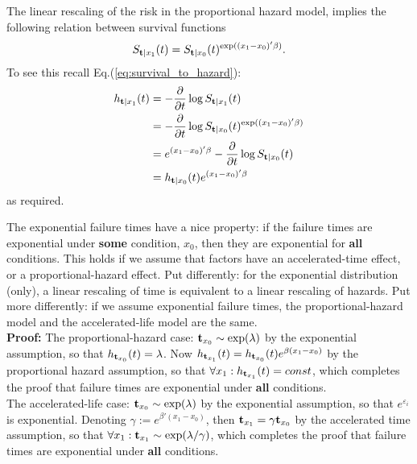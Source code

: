 The linear rescaling of the risk in the proportional hazard model, implies the following relation between survival functions
\begin{align}
\label{eq:survival_proportional_hazard}
	S_{\mathbf{t}|x_1} (t)=S_{\mathbf{t}|x_0} (t)^{\exp((x_1-x_0)'\beta)}.
\end{align}
To see this recall Eq.(\ref{eq:survival_to_hazard}):
\begin{align*}
h_{\mathbf{t}|x_1} (t) 
&=  - \frac{\partial}{\partial t} \log S_{\mathbf{t}|x_1} (t)  \\
&= - \frac{\partial}{\partial t} \log S_{\mathbf{t}|x_0} (t)^{\exp((x_1-x_0)'\beta)} \\
&= e^{(x_1-x_0)'\beta} - \frac{\partial}{\partial t}  \log S_{\mathbf{t}|x_0} (t) \\
&=  h_{\mathbf{t}|x_0} (t) e^{(x_1-x_0)'\beta} 
\end{align*}
as required.






\begin{example}
The exponential failure times have a nice property:
if the failure times are exponential under \textbf{some} condition, $x_0$, then they are exponential for \textbf{all} conditions. 
This holds if we assume that factors have an accelerated-time effect, or a proportional-hazard effect. 
Put differently: for the exponential distribution (only), a linear rescaling of time is equivalent to a linear rescaling of hazards. 
Put more differently: if we assume exponential failure times, the proportional-hazard model and the accelerated-life model are the same. \\
\textbf{Proof:}
The proportional-hazard case:
$\mathbf{t}_{x_0}\sim \exp(\lambda)$ by the exponential assumption, so that 
$h_{\mathbf{t}_{x_0}} (t)=\lambda$.
Now $h_{\mathbf{t}_{x_1}} (t)=h_{\mathbf{t}_{x_0}} (t) e^{\beta(x_1-x_0)}$ by the proportional hazard assumption, so that $\forall x_1: h_{\mathbf{t}_{x_1}} (t)= const$, which completes the proof that failure times are exponential under \textbf{all} conditions. \\
The accelerated-life case:
$\mathbf{t}_{x_0}\sim \exp(\lambda)$ by the exponential assumption, so that 
$e^{\varepsilon_i}$ is exponential.
Denoting $\gamma:=e^{\beta'(x_1-x_0)}$, then $\mathbf{t}_{x_1} = \gamma \mathbf{t}_{x_0} $ by the accelerated time assumption, so that $\forall x_1: \mathbf{t}_{x_1} \sim \exp(\lambda/\gamma)$, which completes the proof that failure times are exponential under \textbf{all} conditions. 
\end{example}





